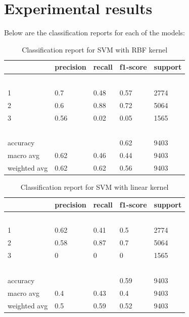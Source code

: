 \documentclass{article}
\begin{document}
\section*{Experimental results}
Below are the classification reports for each of the models:\\
\begin{table}[!ht]
    \centering
    \begin{tabular}{|l|l|l|l|l|}
    \hline
        ~ & precision & recall & f1-score & support \\ \hline
        ~ & ~ & ~ & ~ & ~ \\ \hline
        1 & 0.7 & 0.48 & 0.57 & 2774 \\ \hline
        2 & 0.6 & 0.88 & 0.72 & 5064 \\ \hline
        3 & 0.56 & 0.02 & 0.05 & 1565 \\ \hline
        ~ & ~ & ~ & ~ & ~ \\ \hline
        accuracy & ~ & ~ & 0.62 & 9403 \\ \hline
        macro avg & 0.62 & 0.46 & 0.44 & 9403 \\ \hline
        weighted avg & 0.62 & 0.62 & 0.56 & 9403 \\ \hline
    \end{tabular}
    \caption{Classification report for SVM with RBF kernel}
\end{table}
\begin{table}[!ht]
    \centering
    \begin{tabular}{|l|l|l|l|l|}
    \hline
        ~ & precision & recall & f1-score & support \\ \hline
        ~ & ~ & ~ & ~ & ~ \\ \hline
        1 & 0.62 & 0.41 & 0.5 & 2774 \\ \hline
        2 & 0.58 & 0.87 & 0.7 & 5064 \\ \hline
        3 & 0 & 0 & 0 & 1565 \\ \hline
        ~ & ~ & ~ & ~ & ~ \\ \hline
        accuracy & ~ & ~ & 0.59 & 9403 \\ \hline
        macro avg & 0.4 & 0.43 & 0.4 & 9403 \\ \hline
        weighted avg & 0.5 & 0.59 & 0.52 & 9403 \\ \hline
    \end{tabular}
    \caption{Classification report for SVM with linear kernel}
\end{table}
\end{document}
